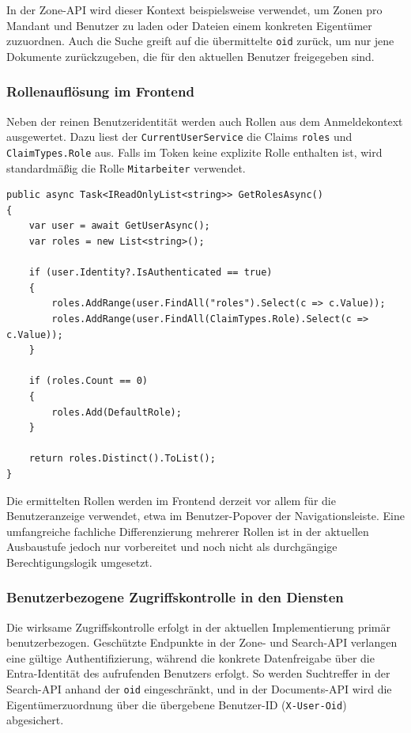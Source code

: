 In der Zone-API wird dieser Kontext beispielsweise verwendet, um Zonen pro
Mandant und Benutzer zu laden oder Dateien einem konkreten Eigentümer
zuzuordnen. Auch die Suche greift auf die übermittelte \texttt{oid} zurück, um
nur jene Dokumente zurückzugeben, die für den aktuellen Benutzer freigegeben
sind.

\subsubsection{Rollenauflösung im Frontend}

Neben der reinen Benutzeridentität werden auch Rollen aus dem Anmeldekontext
ausgewertet. Dazu liest der \texttt{CurrentUserService} die Claims
\texttt{roles} und \texttt{ClaimTypes.Role} aus. Falls im Token keine explizite
Rolle enthalten ist, wird standardmäßig die Rolle \texttt{Mitarbeiter}
verwendet.

\begin{lstlisting}[language={[Sharp]C},caption={Rollenauflösung mit Standardrolle},label={lst:user-roles-default}]
public async Task<IReadOnlyList<string>> GetRolesAsync()
{
    var user = await GetUserAsync();
    var roles = new List<string>();

    if (user.Identity?.IsAuthenticated == true)
    {
        roles.AddRange(user.FindAll("roles").Select(c => c.Value));
        roles.AddRange(user.FindAll(ClaimTypes.Role).Select(c => c.Value));
    }

    if (roles.Count == 0)
    {
        roles.Add(DefaultRole);
    }

    return roles.Distinct().ToList();
}
\end{lstlisting}

Die ermittelten Rollen werden im Frontend derzeit vor allem für die
Benutzeranzeige verwendet, etwa im Benutzer-Popover der Navigationsleiste. Eine
umfangreiche fachliche Differenzierung mehrerer Rollen ist in der aktuellen
Ausbaustufe jedoch nur vorbereitet und noch nicht als durchgängige
Berechtigungslogik umgesetzt.

\subsubsection{Benutzerbezogene Zugriffskontrolle in den Diensten}

Die wirksame Zugriffskontrolle erfolgt in der aktuellen Implementierung primär
benutzerbezogen. Geschützte Endpunkte in der Zone- und Search-API verlangen eine
gültige Authentifizierung, während die konkrete Datenfreigabe über die
Entra-Identität des aufrufenden Benutzers erfolgt. So werden Suchtreffer in der
Search-API anhand der \texttt{oid} eingeschränkt, und in der Documents-API wird
die Eigentümerzuordnung über die übergebene Benutzer-ID
(\texttt{X-User-Oid}) abgesichert.

